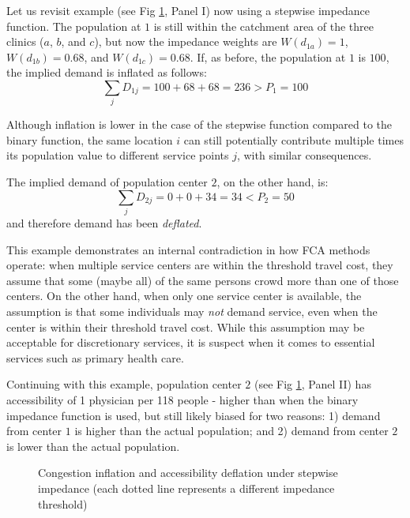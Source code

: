 \documentclass[10pt,letterpaper]{article}
\begin{document}
Let us revisit example (see Fig \ref{fig:fig2-example-2}, Panel I) now
using a stepwise impedance function. The population at \(1\) is still
within the catchment area of the three clinics (\(a\), \(b\), and
\(c\)), but now the impedance weights are \(W(d_{1a})=1\),
\(W(d_{1b})=0.68\), and \(W(d_{1c})=0.68\). If, as before, the
population at \(1\) is \(100\), the implied demand is inflated as
follows: \[
\sum_jD_{1j} = 100 + 68 + 68 = 236 > P_1 = 100
\]

Although inflation is lower in the case of the stepwise function
compared to the binary function, the same location \(i\) can still
potentially contribute multiple times its population value to different
service points \(j\), with similar consequences.

The implied demand of population center \(2\), on the other hand, is: \[
\sum_jD_{2j} = 0 + 0 + 34 = 34 < P_2 = 50
\] and therefore demand has been \emph{deflated}.

This example demonstrates an internal contradiction in how FCA methods
operate: when multiple service centers are within the threshold travel
cost, they assume that some (maybe all) of the same persons crowd more
than one of those centers. On the other hand, when only one service
center is available, the assumption is that some individuals may
\emph{not} demand service, even when the center is within their
threshold travel cost. While this assumption may be acceptable for
discretionary services, it is suspect when it comes to essential
services such as primary health care.

Continuing with this example, population center \(2\) (see Fig
\ref{fig:fig2-example-2}, Panel II) has accessibility of 1 physician per
118 people - higher than when the binary impedance function is used, but
still likely biased for two reasons: 1) demand from center \(1\) is
higher than the actual population; and 2) demand from center \(2\) is
lower than the actual population.

\begin{figure}[htbp]
\centering
\caption{\label{fig:fig2-example-2}Congestion inflation and
accessibility deflation under stepwise impedance (each dotted line
represents a different impedance threshold)}
\end{figure}
\end{document}
